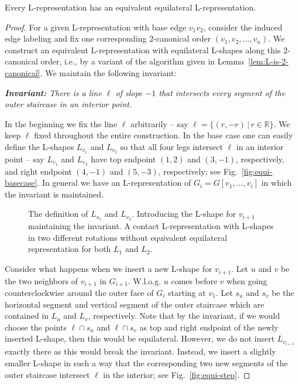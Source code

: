 \documentclass{llncs}
\begin{document}
\begin{theorem}\label{th:equiL}
 Every L-representation has an equivalent equilateral L-representation.
\end{theorem}
\begin{proof}
 For a given L-representation with base edge $v_1v_2$, consider the induced edge labeling and fix one corresponding $2$-canonical order $(v_1,v_2,\ldots,v_n)$. We construct an equivalent L-representation with equilateral L-shapes along this $2$-canonical order, i.e., by a variant of the algorithm given in Lemma~\ref{lem:L-is-2-canonical}. We maintain the following invariant:
  
 \medskip
 \textit{{\bf Invariant:} 
  There is a line $\ell$ of slope $-1$ that intersects every segment of the outer staircase in an interior point.
 }
 \medskip

 In the beginning we fix the line $\ell$ arbitrarily -- say $\ell = \{(r,-r) \,|\, r \in \mathbb{R}\}$. We keep $\ell$ fixed throughout the entire construction. In the base case one can easily define the L-shapes $L_{v_1}$ and $L_{v_2}$ so that all four legs intersect $\ell$ in an interior point -- say $L_{v_1}$ and $L_{v_2}$ have top endpoint $(1,2)$ and $(3,-1)$, respectively, and right endpoint $(4,-1)$ and $(5,-3)$, respectively; see Fig.~\ref{fig:equi-basecase}. In general we have an L-representation of $G_i = G[v_1,\ldots,v_i]$ in which the invariant is maintained.

 \begin{figure}[t!]
\centering
  \hspace{1em}
  \hspace{0em}
  \caption{ The definition of $L_{v_1}$ and $L_{v_2}$.  Introducing the L-shape for $v_{i+1}$ maintaining the invariant. 
A contact L-representation with L-shapes in two different rotations without equivalent equilateral representation for both $L_1$ and $L_2$.}
  \label{fig:equi}
 \end{figure}

 Consider what happens when we insert a new L-shape for $v_{i+1}$. Let $u$ and $v$ be the two neighbors of $v_{i+1}$ in $G_{i+1}$. W.l.o.g. $u$ comes before $v$ when going counterclockwise around the outer face of $G_i$ starting at $v_1$. Let $s_u$ and $s_v$ be the horizontal segment and vertical segment of the outer staircase which are contained in $L_u$ and $L_v$, respectively. Note that by the invariant, if we would choose the points $\ell \cap s_u$ and $\ell \cap s_v$ as top and right endpoint of the newly inserted L-shape, then this would be equilateral. However, we do not insert $L_{v_{i+1}}$ exactly there as this would break the invariant. Instead, we insert a
 slightly smaller L-shape in such a way that the corresponding two new segments of the outer staircase intersect $\ell$ in the interior; see Fig.~\ref{fig:equi-step}.
\end{proof}
\end{document}
